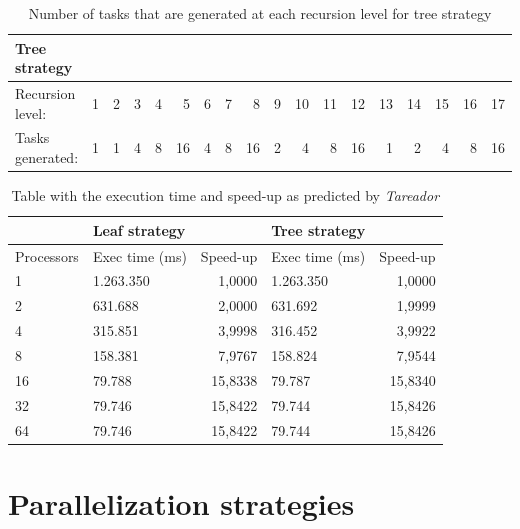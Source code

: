 \begin{table}[H]
\centering
\begin{tabular}{lrrrrrrrrrrrrrrrrr}
\toprule
Tree strategy & & & & & & & & & & & & & & & & &\\
\midrule
Recursion level:        & 1     & 2     & 3     & 4     & 5     & 6     & 7     & 8     & 9     & 10    & 11    & 12    & 13    & 14    & 15    & 16    & 17  \\
Tasks generated:    & 1     & 1     & 4     & 8     & 16    & 4     & 8     & 16    & 2     & 4     & 8     & 16    & 1     & 2     & 4     & 8    & 16 \\
\bottomrule
\end{tabular}

\caption{Number of tasks that are generated at each recursion level for tree strategy} 
\label{tab:tree_tasks-rec_level}
\end{table}

\begin{table}[H]
\centering
\begin{tabular}{llrlr}
\toprule
           & Leaf strategy &           & Tree strategy &           \\
\midrule
Processors & Exec time (ms)& Speed-up  & Exec time (ms)& Speed-up  \\
\midrule
1          & 1.263.350     & 1,0000    & 1.263.350     & 1,0000    \\
2          & 631.688       & 2,0000    & 631.692       & 1,9999    \\
4          & 315.851       & 3,9998    & 316.452       & 3,9922    \\
8          & 158.381       & 7,9767    & 158.824       & 7,9544    \\
16         & 79.788        & 15,8338   & 79.787        & 15,8340   \\
32         & 79.746        & 15,8422   & 79.744        & 15,8426   \\
64         & 79.746        & 15,8422   & 79.744        & 15,8426   \\
\bottomrule
\end{tabular}
\caption{Table with the execution time and speed-up as predicted by \emph{Tareador}} 
\label{tab:Exec_time-Speed-up}
\end{table}


\section{Parallelization strategies}%
\label{sec:par_strats}


